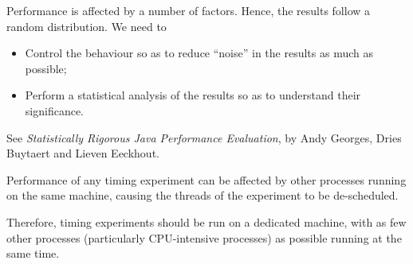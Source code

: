 



\begin{slide}

Performance is affected by a number of factors.  Hence, the results follow a
random distribution.  We need to
%
\begin{itemize}
\item
Control the behaviour so as to reduce ``noise'' in the results as much as
possible;

\item
Perform a statistical analysis of the results so as to understand their
significance.
\end{itemize}

See \emph{Statistically Rigorous Java Performance Evaluation}, by Andy
Georges, Dries Buytaert and Lieven Eeckhout.
\end{slide}


\begin{slide}

Performance of any timing experiment can be affected by other processes
running on the same machine, causing the threads of the experiment to be
de-scheduled. 

Therefore, timing experiments should be run on a dedicated machine, with as
few other processes (particularly CPU-intensive processes) as possible running
at the same time.

\end{slide}


